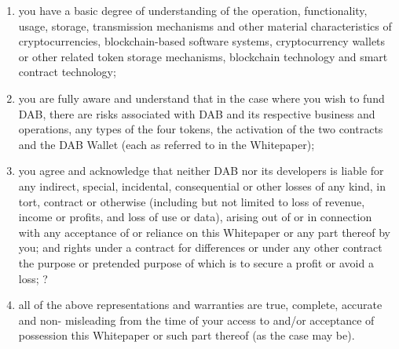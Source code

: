 \documentclass[review]{elsarticle}
\begin{document}
\begin{enumerate}
   \item you have a basic degree of understanding of the operation, functionality, usage, storage, transmission mechanisms and other material characteristics of cryptocurrencies, blockchain-based software systems, cryptocurrency wallets or other related token storage mechanisms, blockchain technology and smart contract technology;
   \item you are fully aware and understand that in the case where you wish to fund DAB, there are risks associated with DAB and its respective business and operations, any types of the four tokens, the activation of the two contracts and the DAB Wallet (each as referred to in the Whitepaper);
   \item you agree and acknowledge that neither DAB nor its developers is liable for any indirect, special, incidental, consequential or other losses of any kind, in tort, contract or otherwise (including but not limited to loss of revenue, income or profits, and loss of use or data), arising out of or in connection with any acceptance of or reliance on this Whitepaper or any part thereof by you; and rights under a contract for differences or under any other contract the purpose or pretended purpose of which is to secure a profit or avoid a loss;
?   \item all of the above representations and warranties are true, complete, accurate and non- misleading from the time of your access to and/or acceptance of possession this Whitepaper or such part thereof (as the case may be).
\end{enumerate}
\end{document}

